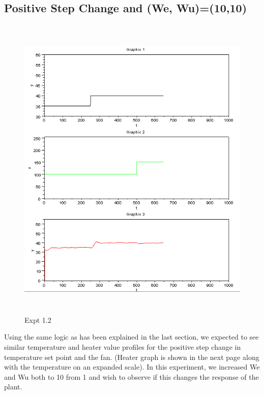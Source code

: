 \subsection{Positive Step Change and (We, Wu)=(10,10)}
\begin{figure}[H]
  \includegraphics[width=12cm, height=15cm]{mpc/1_2.png}
  \caption{Expt 1.2}
\end{figure}
Using the same logic as has been explained in the last section, we expected to see similar temperature and heater value profiles for the positive step change in temperature set point and the fan. (Heater graph is shown in the next page along with the temperature on an expanded scale).  In this experiment, we increased We and Wu both to 10 from 1 and wish to observe if this changes the response of the plant.
